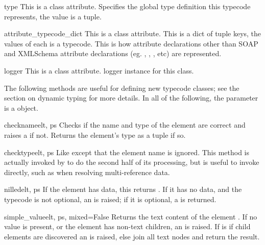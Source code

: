 \begin{memberdesc}{type}
This is a class attribute.
Specifies the global type definition this typecode represents, the value is
a  tuple.
\end{memberdesc}

\begin{memberdesc}{attribute_typecode_dict}
This is a class attribute.
This is a dict of  tuple keys, the values of each is a 
typecode.  This is how attribute declarations other than SOAP and XMLSchema
attribute declarations (eg. , , , etc) are
represented.
\end{memberdesc}

\begin{memberdesc}{logger}
This is a class attribute.
logger instance for this class.
\end{memberdesc}

The following methods are useful for defining new typecode classes;
see the section on dynamic typing for more details.  In all of the following,
the  parameter is a  object.

\begin{methoddesc}{checkname}{elt, ps}
Checks if the name and type of the element  are
correct and raises a  if not.
Returns the element's type as a  tuple if so.
\end{methoddesc}

\begin{methoddesc}{checktype}{elt, ps}
Like  except that the element name is ignored.
This method is actually invoked by  to do the
second half of its processing, but is useful to invoke
directly, such as when resolving multi-reference data.
\end{methoddesc}

\begin{methoddesc}{nilled}{elt, ps}
If the element  has data, this returns .
If it has no data, and the typecode is not optional, an
 is raised; if it is optional,
a  is returned.
\end{methoddesc}

\begin{methoddesc}{simple_value}{elt, ps, mixed=False}
Returns the text content of the element .
If no value is present, or the element has non-text children, an
 is raised.  If  is  if
child elements are discovered an  is raised, else
join all text nodes and return the result.

\end{methoddesc}


